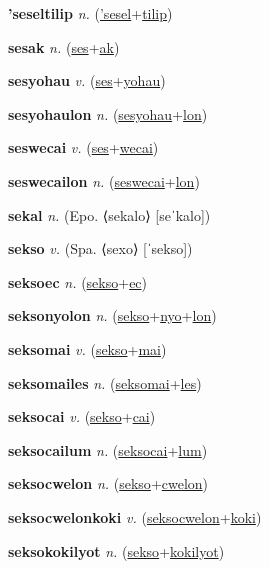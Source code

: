 \textbf{\hypertarget{'seseltilip}{'seseltilip}} \textit{n.} (\hyperlink{'sesel}{'sesel}+\allowbreak \hyperlink{tilip}{tilip})


\textbf{\hypertarget{sesak}{sesak}} \textit{n.} (\hyperlink{ses}{ses}+\allowbreak \hyperlink{ak}{ak})


\textbf{\hypertarget{sesyohau}{sesyohau}} \textit{v.} (\hyperlink{ses}{ses}+\allowbreak \hyperlink{yohau}{yohau})


\textbf{\hypertarget{sesyohaulon}{sesyohaulon}} \textit{n.} (\hyperlink{sesyohau}{sesyohau}+\allowbreak \hyperlink{lon}{lon})


\textbf{\hypertarget{seswecai}{seswecai}} \textit{v.} (\hyperlink{ses}{ses}+\allowbreak \hyperlink{wecai}{wecai})


\textbf{\hypertarget{seswecailon}{seswecailon}} \textit{n.} (\hyperlink{seswecai}{seswecai}+\allowbreak \hyperlink{lon}{lon})


\textbf{\hypertarget{sekal}{sekal}} \textit{n.} (Epo. ⟨sekalo⟩ [seˈkalo])


\textbf{\hypertarget{sekso}{sekso}} \textit{v.} (Spa. ⟨sexo⟩ [ˈsekso])


\textbf{\hypertarget{seksoec}{seksoec}} \textit{n.} (\hyperlink{sekso}{sekso}+\allowbreak \hyperlink{ec}{ec})


\textbf{\hypertarget{seksonyolon}{seksonyolon}} \textit{n.} (\hyperlink{sekso}{sekso}+\allowbreak \hyperlink{nyo}{nyo}+\allowbreak \hyperlink{lon}{lon})


\textbf{\hypertarget{seksomai}{seksomai}} \textit{v.} (\hyperlink{sekso}{sekso}+\allowbreak \hyperlink{mai}{mai})


\textbf{\hypertarget{seksomailes}{seksomailes}} \textit{n.} (\hyperlink{seksomai}{seksomai}+\allowbreak \hyperlink{les}{les})


\textbf{\hypertarget{seksocai}{seksocai}} \textit{v.} (\hyperlink{sekso}{sekso}+\allowbreak \hyperlink{cai}{cai})


\textbf{\hypertarget{seksocailum}{seksocailum}} \textit{n.} (\hyperlink{seksocai}{seksocai}+\allowbreak \hyperlink{lum}{lum})


\textbf{\hypertarget{seksocwelon}{seksocwelon}} \textit{n.} (\hyperlink{sekso}{sekso}+\allowbreak \hyperlink{cwelon}{cwelon})


\textbf{\hypertarget{seksocwelonkoki}{seksocwelonkoki}} \textit{v.} (\hyperlink{seksocwelon}{seksocwelon}+\allowbreak \hyperlink{koki}{koki})


\textbf{\hypertarget{seksokokilyot}{seksokokilyot}} \textit{n.} (\hyperlink{sekso}{sekso}+\allowbreak \hyperlink{kokilyot}{kokilyot})


